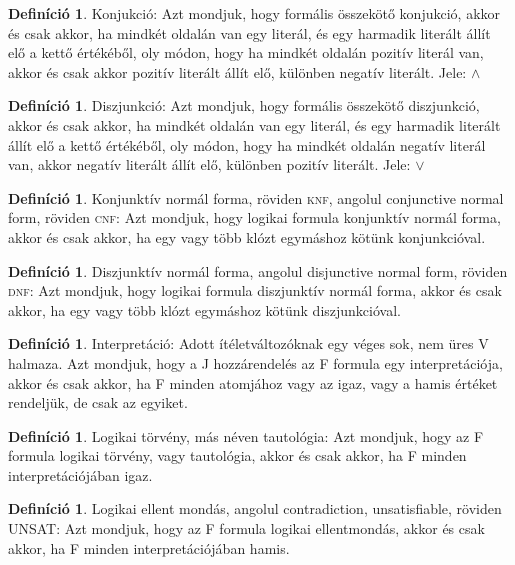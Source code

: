 \documentclass[
]{thesis-ekf}
\theoremstyle{definition}
\newtheorem{definicio}[tetel]{Definíció}
\theoremstyle{remark}
\begin{document}
	\begin{definicio}
		Konjukció: Azt mondjuk, hogy formális összekötő konjukció, akkor és csak akkor, ha mindkét oldalán van egy literál, és egy harmadik literált állít elő a kettő értékéből, oly módon, hogy ha mindkét oldalán pozitív literál van, akkor és csak akkor pozitív literált állít elő, különben negatív literált. Jele: $\wedge$
	\end{definicio}
	\begin{definicio}
		Diszjunkció: Azt mondjuk, hogy formális összekötő diszjunkció, akkor és csak akkor, ha mindkét oldalán van egy literál, és egy harmadik literált állít elő a kettő értékéből, oly módon, hogy ha mindkét oldalán negatív literál van, akkor negatív literált állít elő, különben pozitív literált. Jele: $\vee$
	\end{definicio}
	\begin{definicio}\label{cnf} %
		Konjunktív normál forma, röviden \textsc{knf}, angolul conjunctive normal form, röviden \textsc{cnf}: Azt mondjuk, hogy logikai formula konjunktív normál forma, akkor és csak akkor, ha egy vagy több klózt egymáshoz kötünk konjunkcióval.
	\end{definicio}
	\begin{definicio}\label{dnf}
		Diszjunktív normál forma, angolul disjunctive normal form, röviden \textsc{dnf}: Azt mondjuk, hogy logikai formula diszjunktív normál forma, akkor és csak akkor, ha egy vagy több klózt egymáshoz kötünk diszjunkcióval.
	\end{definicio}
	\begin{definicio}
		Interpretáció: Adott ítéletváltozóknak egy véges sok, nem üres V halmaza.
		Azt mondjuk, hogy a J hozzárendelés az F formula egy interpretációja, akkor és csak akkor, ha F minden atomjához vagy az igaz, vagy a hamis értéket rendeljük, de csak az egyiket.
	\end{definicio}
	\begin{definicio}\label{tautologia}
		Logikai törvény, más néven tautológia: Azt mondjuk, hogy az F formula logikai törvény, vagy tautológia, akkor és csak akkor, ha F minden interpretációjában igaz.
	\end{definicio}
	\begin{definicio}
		Logikai ellent mondás, angolul contradiction, unsatisfiable, röviden UNSAT: Azt mondjuk, hogy az F formula logikai ellentmondás, akkor és csak akkor, ha F minden interpretációjában hamis.
	\end{definicio}
\end{document}
